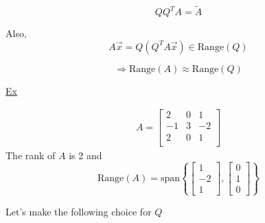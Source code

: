 \begin{equation*}
    QQ^TA =  \widetilde{A}
\end{equation*}

Also,
\begin{equation*}
    A\vec{x} = Q\left(Q^TA\vec{x}\right) \in \text{Range}(Q)
\end{equation*}

\begin{equation*}
    \Rightarrow \text{Range}(A) \approx \text{Range}(Q)
\end{equation*}

\underline{Ex}

\begin{align*}
    A =
\begin{bmatrix}
    2 & 0 & 1 \\
    -1 & 3 & -2 \\
    2 & 0 & 1 \\
\end{bmatrix}
\end{align*}
The rank of $A$ is 2 and
\begin{equation*}
    \text{Range}(A) = \text{span}\left\{
\begin{bmatrix}
1\\-2\\1
\end{bmatrix},
\begin{bmatrix}
0\\1\\0
\end{bmatrix}
    \right\}
\end{equation*}

Let's make the following choice for $Q$

